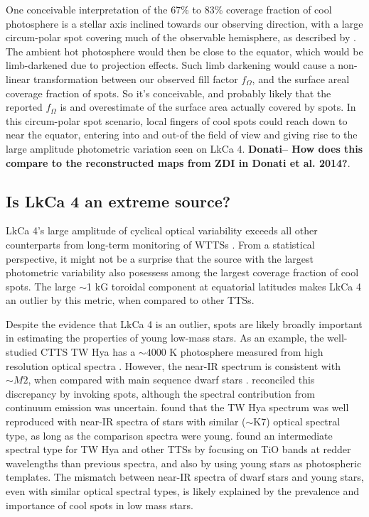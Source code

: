 \documentclass[twocolumn]{emulateapj}%
\newcommand{\name}{LkCa 4 }
\begin{document}
One conceivable interpretation of the 67\% to 83\% coverage fraction of cool photosphere is a stellar axis inclined towards our observing direction, with a large circum-polar spot covering much of the observable hemisphere, as described by \citet{donati14}.  The ambient hot photosphere would then be close to the equator, which would be limb-darkened due to projection effects.  Such limb darkening would cause a non-linear transformation between our observed fill factor $f_{\Omega}$, and the surface areal coverage fraction of spots.  So it's conceivable, and probably likely that the reported $f_{\Omega}$ is and overestimate of the surface area actually covered by spots.  In this circum-polar spot scenario, local fingers of cool spots could reach down to near the equator, entering into and out-of the field of view and giving rise to the large amplitude photometric variation seen on LkCa 4.  {\bf Donati-- How does this compare to the reconstructed maps from ZDI in Donati et al. 2014?}.

\subsection{Is \name an extreme source?}
LkCa 4's large amplitude of cyclical optical variability exceeds all other counterparts from long-term monitoring of WTTSs \citep{grankin08}.  From a statistical perspective, it might not be a surprise that the source with the largest photometric variability also posessess among the largest coverage fraction of cool spots.  The large $\sim$1 kG toroidal component at equatorial latitudes makes LkCa 4 an outlier by this metric, when compared to other TTSs.

Despite the evidence that LkCa 4 is an outlier, spots are likely broadly important in estimating the properties of young low-mass stars. As an example, the well-studied CTTS TW Hya has a $\sim 4000$ K photosphere measured from high resolution optical spectra \citep[e.g.][]{yang05}.  However, the near-IR spectrum is consistent with $\sim M2$, when compared with main sequence dwarf stars \citep{vacca11}.  \citet{debes13} reconciled this discrepancy by invoking spots, although the spectral contribution from continuum emission was uncertain.  \citet{mcclure13} found that the TW Hya spectrum was well reproduced with near-IR spectra of stars with similar ($\sim$K7) optical spectral type, as long as the comparison spectra were young.   \citet{herczeg14} found an intermediate spectral type for TW Hya and other TTSs by focusing on TiO bands at redder wavelengths than previous spectra, and also by using young stars as photospheric templates.  The mismatch between near-IR spectra of dwarf stars and young stars, even with similar optical spectral types, is likely explained by the prevalence and importance of cool spots in low mass stars.
\end{document}
